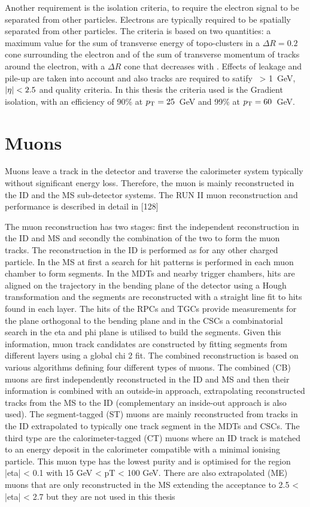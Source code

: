 Another requirement is the isolation criteria, to require the electron signal to be separated from other particles.  
Electrons are typically required to be spatially separated from other particles. The criteria is based on two quantities: a maximum value for the sum of transverse energy of topo-clusters in a $\Delta R=0.2$ cone surrounding the electron and of the sum of transverse momentum of tracks around the electron, with a $\Delta R$ cone that decreases with \pT. Effects of leakage and pile-up are taken into account and also tracks are required to satify \pT\ > 1~GeV, $\abs{\eta}<2.5$ and quality criteria. In this thesis the criteria used is the Gradient isolation, with an efficiency of 90\% at $p_{\text{T}} = 25$~GeV and 99\% at $p_{\text{T}} = 60$~GeV.

\section{Muons}

Muons leave a track in the detector and traverse the calorimeter system typically without significant
energy loss. Therefore, the muon is mainly reconstructed in the ID and the MS sub-detector systems.
The RUN II muon reconstruction and performance is described in detail in [128]

The muon reconstruction has two stages: first the independent reconstruction in the ID and MS
and secondly the combination of the two to form the muon tracks. The reconstruction in the ID is
performed as for any other charged particle.
In the MS at first a search for hit patterns is performed in each muon chamber to form segments. In
the MDTs and nearby trigger chambers, hits are aligned on the trajectory in the bending plane of
the detector using a Hough transformation and the segments are reconstructed with a straight line
fit to hits found in each layer. The hits of the RPCs and TGCs provide measurements for the plane
orthogonal to the bending plane and in the CSCs a combinatorial search in the eta and phi plane is
utilised to build the segments. Given this information, muon track candidates are constructed by
fitting segments from different layers using a global chi
2 fit.
The combined reconstruction is based on various algorithms defining four different types of muons.
The combined (CB) muons are first independently reconstructed in the ID and MS and then their
information is combined with an outside-in approach, extrapolating reconstructed tracks from the MS
to the ID (complementary an inside-out approach is also used). The segment-tagged (ST) muons are
mainly reconstructed from tracks in the ID extrapolated to typically one track segment in the MDTs
and CSCs. The third type are the calorimeter-tagged (CT) muons where an ID track is matched to an
energy deposit in the calorimeter compatible with a minimal ionising particle. This muon type has
the lowest purity and is optimised for the region |eta| < 0.1 with 15 GeV < pT < 100 GeV. There
are also extrapolated (ME) muons that are only reconstructed in the MS extending the acceptance to
2.5 < |eta| < 2.7 but they are not used in this thesis

